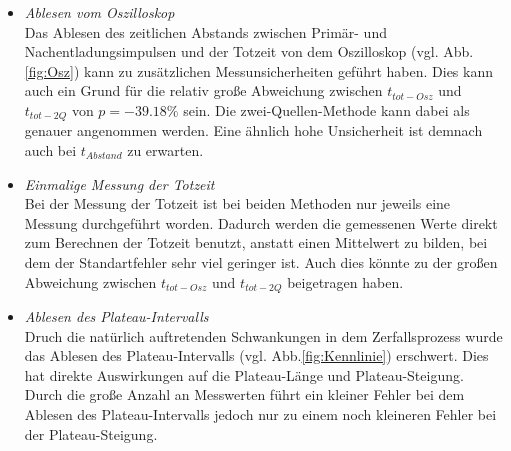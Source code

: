 \begin{itemize}
    \item \textit{Ablesen vom Oszilloskop}\\
        Das Ablesen des zeitlichen Abstands zwischen Primär- und Nachentladungsimpulsen und der Totzeit
        von dem Oszilloskop (vgl. Abb.\ref{fig:Osz}) kann zu zusätzlichen Messunsicherheiten geführt haben.
        Dies kann auch ein Grund für die relativ große Abweichung zwischen $t_{tot-Osz}$ und 
        $t_{tot-2Q}$ von $p=\num{-39.18}\%$ sein. Die zwei-Quellen-Methode kann dabei als 
        genauer angenommen werden. Eine ähnlich hohe Unsicherheit ist demnach auch bei $t_{Abstand}$
        zu erwarten. 
    \item \textit{Einmalige Messung der Totzeit}\\
        Bei der Messung der Totzeit ist bei beiden Methoden nur jeweils eine Messung durchgeführt worden.
        Dadurch werden die gemessenen Werte direkt zum Berechnen der Totzeit benutzt, anstatt einen 
        Mittelwert zu bilden, bei dem der Standartfehler sehr viel geringer ist. Auch dies könnte zu 
        der großen Abweichung zwischen $t_{tot-Osz}$ und $t_{tot-2Q}$ beigetragen haben.
    \item \textit{Ablesen des Plateau-Intervalls}\\
        Druch die natürlich auftretenden Schwankungen in dem Zerfallsprozess wurde das Ablesen des 
        Plateau-Intervalls (vgl. Abb.\ref{fig:Kennlinie}) erschwert. Dies hat direkte Auswirkungen auf
        die Plateau-Länge und Plateau-Steigung. Durch die große Anzahl an Messwerten führt ein kleiner
        Fehler bei dem Ablesen des Plateau-Intervalls jedoch nur zu einem noch kleineren Fehler bei der
        Plateau-Steigung.
\end{itemize}